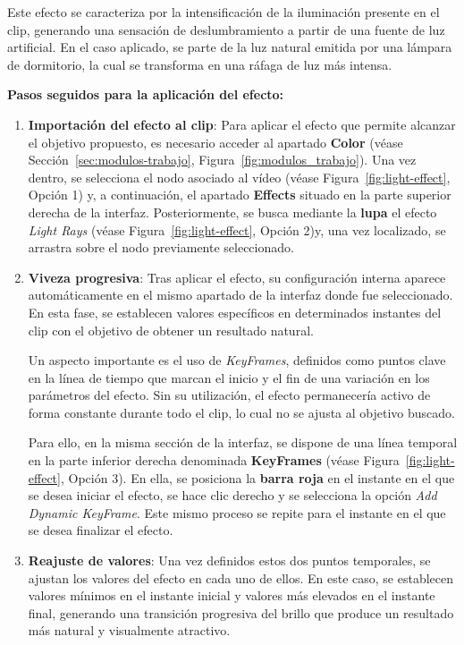 Este efecto se caracteriza por la intensificación de la iluminación presente en el clip, 
generando una sensación de deslumbramiento a partir de una fuente de luz artificial. 
En el caso aplicado, se parte de la luz natural emitida por una lámpara de dormitorio, 
la cual se transforma en una ráfaga de luz más intensa.

\textbf{Pasos seguidos para la aplicación del efecto:}
\begin{enumerate}[label=\arabic*.]

    \item \textbf{Importación del efecto al clip}: Para aplicar el efecto que permite alcanzar el objetivo propuesto, es necesario 
    acceder al apartado \textbf{Color} (véase Sección~\ref{sec:modulos-trabajo}, Figura~\ref{fig:modulos_trabajo}). Una vez dentro, 
    se selecciona el nodo asociado al vídeo (véase Figura~\ref{fig:light-effect}, Opción 1) y, a continuación, el apartado \textbf{Effects} 
    situado en la parte superior derecha de la interfaz. Posteriormente, se busca mediante la \textbf{lupa} el 
    efecto \textit{Light Rays} (véase Figura~\ref{fig:light-effect}, Opción 2)y, una vez localizado, se arrastra 
    sobre el nodo previamente seleccionado.

    \item \textbf{Viveza progresiva}: Tras aplicar el efecto, su configuración interna aparece automáticamente en el mismo apartado 
    de la interfaz donde fue seleccionado. En esta fase, se establecen valores específicos en determinados instantes del clip con el 
    objetivo de obtener un resultado natural.

    Un aspecto \textcolor{importante}{importante} es el uso de \textit{KeyFrames}, definidos como puntos clave en la línea de 
    tiempo que marcan el inicio y el fin de una variación en los parámetros del efecto. Sin su utilización, el efecto permanecería 
    activo de forma constante durante todo el clip, lo cual no se ajusta al objetivo buscado.

    Para ello, en la misma sección de la interfaz, se dispone de una línea temporal en la parte inferior derecha denominada 
    \textbf{KeyFrames} (véase Figura~\ref{fig:light-effect}, Opción 3). En ella, se posiciona la \textbf{barra roja} en el instante en el que se desea iniciar el efecto, se hace 
    clic derecho y se selecciona la opción \textit{Add Dynamic KeyFrame}. Este mismo proceso se repite para el instante en el que se 
    desea finalizar el efecto.

    \item \textbf{Reajuste de valores}:
    Una vez definidos estos dos puntos temporales, se ajustan los valores del efecto en cada uno de ellos. En este caso, se 
    establecen valores mínimos en el instante inicial y valores más elevados en el instante final, generando una transición 
    progresiva del brillo que produce un resultado más natural y visualmente atractivo.


\end{enumerate}
